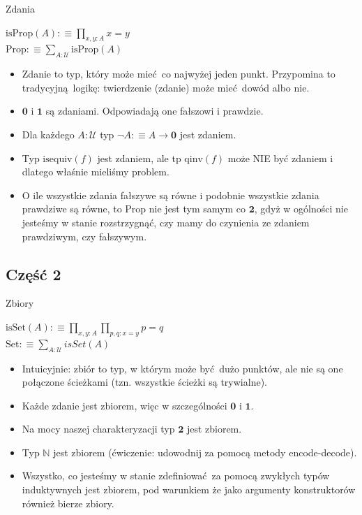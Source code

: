 \documentclass{beamer}
\newcommand{\defn}{:\equiv}
\newcommand{\U}{\mathcal{U}}
\newcommand{\qinv}{\text{qinv}}
\newcommand{\isequiv}{\text{isequiv}}
\newcommand{\isProp}{\text{isProp}}
\newcommand{\isSet}{\text{isSet}}
\newcommand{\Prop}{\text{Prop}}
\newcommand{\Set}{\text{Set}}
\begin{document}
\begin{frame}{Zdania}

\begin{definition}[Zdanie]
$\isProp(A) \defn \prod_{x, y : A} x = y$ \\
$\Prop \defn \sum_{A : \U} \isProp(A)$
\end{definition}

\begin{itemize}
	\item Zdanie to typ, który może mieć co najwyżej jeden punkt. Przypomina to tradycyjną logikę: twierdzenie (zdanie) może mieć dowód albo nie.
	\item $\mathbf{0}$ i $\mathbf{1}$ są zdaniami. Odpowiadają one fałszowi i prawdzie.
	\item Dla każdego $A : \U$ typ $\neg A \defn A \to \mathbf{0}$ jest zdaniem.
	\item Typ $\isequiv(f)$ jest zdaniem, ale tp $\qinv(f)$ może NIE być zdaniem i dlatego właśnie mieliśmy problem.
	\item O ile wszystkie zdania fałszywe są równe i podobnie wszystkie zdania prawdziwe są równe, to $\Prop$ nie jest tym samym co $\mathbf{2}$, gdyż w ogólności nie jesteśmy w stanie rozstrzygnąć, czy mamy do czynienia ze zdaniem prawdziwym, czy fałszywym.
\end{itemize}

\end{frame}

\subsection{Część 2}

\begin{frame}{Zbiory}

\begin{definition}[Zbiór]
$\isSet(A) \defn \prod_{x, y : A} \prod_{p, q : x = y} p = q$ \\
$\Set \defn \sum_{A : \U} isSet(A)$
\end{definition}

\begin{itemize}
	\item Intuicyjnie: zbiór to typ, w którym może być dużo punktów, ale nie są one połączone ścieżkami (tzn. wszystkie ścieżki są trywialne).
	\item Każde zdanie jest zbiorem, więc w szczególności $\mathbf{0}$ i $\mathbf{1}$.
	\item Na mocy naszej charakteryzacji typ $\mathbf{2}$ jest zbiorem.
	\item Typ $\mathbb{N}$ jest zbiorem (ćwiczenie: udowodnij za pomocą metody encode-decode).
	\item Wszystko, co jesteśmy w stanie zdefiniować za pomocą zwykłych typów induktywnych jest zbiorem, pod warunkiem że jako argumenty konstruktorów również bierze zbiory.
\end{itemize}

\end{frame}
\end{document}
